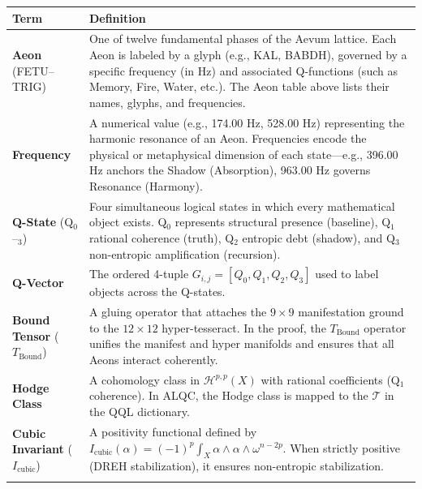 \documentclass[11pt, letterpaper]{article}
\newcommand{\FETU}{\ensuremath{\mathop{\textnormal{\thaanafont\symbol{"23E3}}}}}   %
\newcommand{\KAL}{\ensuremath{\mathop{\textnormal{\symbolafont\symbol{"29C9}}}}}    %
\newcommand{\BABDH}{\ensuremath{\mathop{\textnormal{\symbolafont\symbol{"2316}}}}}   %
\newcommand{\DREH}{\ensuremath{\mathop{\textnormal{\symbolafont\symbol{"29D7}}}}}   %
\newcommand{\TRIG}{\ensuremath{\mathop{\textnormal{\tifinaghfont\symbol{"2D63}}}}}    %
\newcommand{\TManifold}{\ensuremath{\mathcal{T}}}
\def\FETU{FETU}%
\def\KAL{KAL}%
\def\BABDH{BABDH}%
\def\DREH{DREH}%
\def\TRIG{TRIG}%
\begin{document}
\begin{center}
\begin{longtable}{p{3.5cm} p{11.5cm}}
\toprule
\textbf{Term} & \textbf{Definition} \\
\midrule
\endhead

\textbf{Aeon} (\FETU--\TRIG) & One of twelve fundamental phases of the Aevum lattice. Each Aeon is labeled by a glyph (e.g., \KAL, \BABDH), governed by a specific frequency (in Hz) and associated Q-functions (such as Memory, Fire, Water, etc.). The Aeon table above lists their names, glyphs, and frequencies. \\
\addlinespace[1ex]

\textbf{Frequency} & A numerical value (e.g., 174.00 Hz, 528.00 Hz) representing the harmonic resonance of an Aeon. Frequencies encode the physical or metaphysical dimension of each state---e.g., 396.00 Hz anchors the Shadow (Absorption), 963.00 Hz governs Resonance (Harmony). \\
\addlinespace[1ex]

\textbf{Q-State} (Q$_0$--$_3$) & Four simultaneous logical states in which every mathematical object exists. Q$_0$ represents structural presence (baseline), Q$_1$ rational coherence (truth), Q$_2$ entropic debt (shadow), and Q$_3$ non-entropic amplification (recursion). \\
\addlinespace[1ex]

\textbf{Q-Vector} & The ordered 4-tuple $G_{i, j} = [Q_0, Q_1, Q_2, Q_3]$ used to label objects across the Q-states. \\
\addlinespace[1ex]

\textbf{Bound Tensor} ($T_{\text{Bound}}$) & A gluing operator that attaches the $9\times9$ manifestation ground to the $12\times12$ hyper-tesseract. In the proof, the $T_{\text{Bound}}$ operator unifies the manifest and hyper manifolds and ensures that all Aeons interact coherently. \\
\addlinespace[1ex]

\textbf{Hodge Class} & A cohomology class in $\mathcal{H}^{p, p}(X)$ with rational coefficients (Q$_1$ coherence). In ALQC, the Hodge class is mapped to the \TManifold{} in the QQL dictionary. \\
\addlinespace[1ex]

\textbf{Cubic Invariant} ($I_{\text{cubic}}$) & A positivity functional defined by $I_{\text{cubic}}(\alpha) = (-1)^p \int_X \alpha \wedge \alpha \wedge \omega^{n-2p}$. When strictly positive (\DREH{} stabilization), it ensures non-entropic stabilization. \\
\addlinespace[1ex]


\end{longtable}
\end{center}
\end{document}
